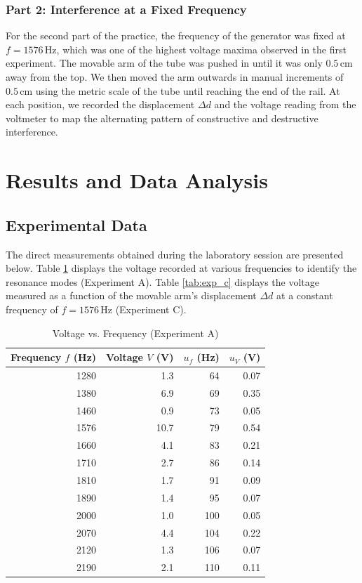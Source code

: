 \documentclass[a4paper,11pt]{article}
\begin{document}
\subsubsection{Part 2: Interference at a Fixed Frequency}
For the second part of the practice, the frequency of the generator was fixed at $f = \ensuremath{1576\,\mathrm{Hz}}$, which was one of the highest voltage maxima observed in the first experiment. The movable arm of the tube was pushed in until it was only \ensuremath{0.5\,\mathrm{cm}} away from the top. We then moved the arm outwards in manual increments of \ensuremath{0.5\,\mathrm{cm}} using the metric scale of the tube until reaching the end of the rail. At each position, we recorded the displacement $\Delta d$ and the voltage reading from the voltmeter to map the alternating pattern of constructive and destructive interference.

\section{Results and Data Analysis}

\subsection{Experimental Data}
The direct measurements obtained during the laboratory session are presented below. Table \ref{tab:exp_a} displays the voltage recorded at various frequencies to identify the resonance modes (Experiment A). Table \ref{tab:exp_c} displays the voltage measured as a function of the movable arm's displacement $\Delta d$ at a constant frequency of $f = 1576\,\mathrm{Hz}$ (Experiment C). 

\begin{table}[H]
    \centering
    \caption{Voltage vs. Frequency (Experiment A)}
    \label{tab:exp_a}
    \begin{tabular}{r r r r}
        \toprule
        {Frequency $f$ (Hz)} & {Voltage $V$ (V)} & {$u_f$ (Hz)} & {$u_V$ (V)} \\
        \midrule
        1280 & 1.3  & 64  & 0.07 \\
        1380 & 6.9  & 69  & 0.35 \\
        1460 & 0.9  & 73  & 0.05 \\
        1576 & 10.7 & 79  & 0.54 \\
        1660 & 4.1  & 83  & 0.21 \\
        1710 & 2.7  & 86  & 0.14 \\
        1810 & 1.7  & 91  & 0.09 \\
        1890 & 1.4  & 95  & 0.07 \\
        2000 & 1.0  & 100 & 0.05 \\
        2070 & 4.4  & 104 & 0.22 \\
        2120 & 1.3  & 106 & 0.07 \\
        2190 & 2.1  & 110 & 0.11 \\
        \bottomrule
    \end{tabular}
\end{table}
\end{document}
